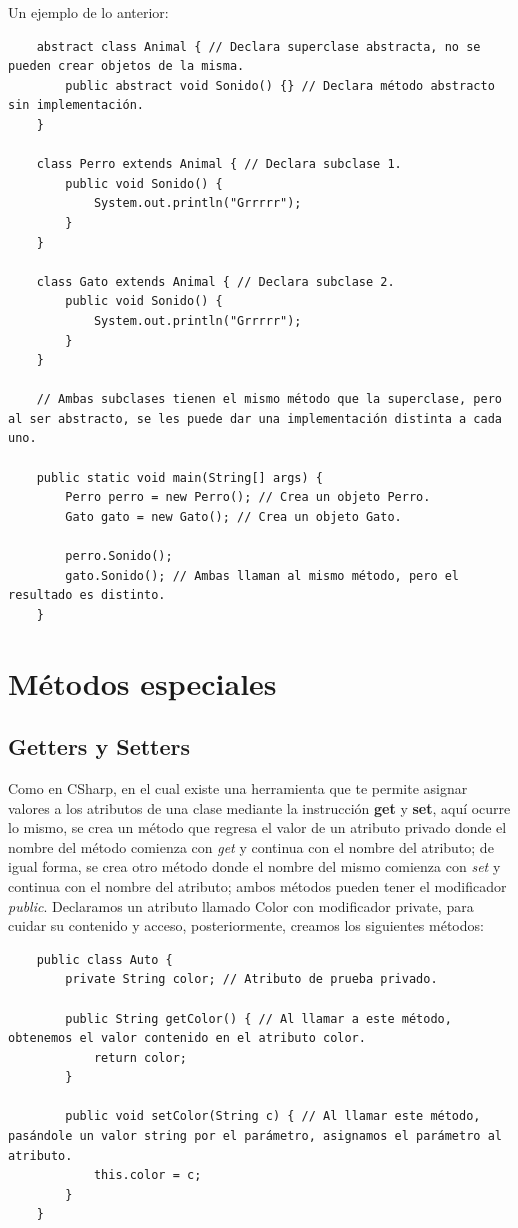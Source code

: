 Un ejemplo de lo anterior:
\begin{lstlisting}
    abstract class Animal { // Declara superclase abstracta, no se pueden crear objetos de la misma.
        public abstract void Sonido() {} // Declara método abstracto sin implementación.
    }
    
    class Perro extends Animal { // Declara subclase 1.
        public void Sonido() {
            System.out.println("Grrrrr");
        }
    }
    
    class Gato extends Animal { // Declara subclase 2.
        public void Sonido() {
            System.out.println("Grrrrr");
        }
    }
    
    // Ambas subclases tienen el mismo método que la superclase, pero al ser abstracto, se les puede dar una implementación distinta a cada uno.
    
    public static void main(String[] args) {
        Perro perro = new Perro(); // Crea un objeto Perro.
        Gato gato = new Gato(); // Crea un objeto Gato.
        
        perro.Sonido();
        gato.Sonido(); // Ambas llaman al mismo método, pero el resultado es distinto.
    }
\end{lstlisting}



\section{Métodos especiales}


\subsection{Getters y Setters}
\hspace{0.55cm}Como en CSharp, en el cual existe una herramienta que te permite asignar valores a los atributos de una clase mediante la instrucción \textbf{get} y \textbf{set}, aquí ocurre lo mismo, se crea un método que regresa el valor de un atributo privado donde el nombre del método comienza con \textit{get} y continua con el nombre del atributo; de igual forma, se crea otro método donde el nombre del mismo comienza con \textit{set} y continua con el nombre del atributo; ambos métodos pueden tener el modificador \textit{public}. Declaramos un atributo llamado Color con modificador private, para cuidar su contenido y acceso, posteriormente, creamos los siguientes métodos:
\begin{lstlisting}
    public class Auto {
        private String color; // Atributo de prueba privado.
        
        public String getColor() { // Al llamar a este método, obtenemos el valor contenido en el atributo color.
            return color;
        }
        
        public void setColor(String c) { // Al llamar este método, pasándole un valor string por el parámetro, asignamos el parámetro al atributo.
            this.color = c;
        }
    }
\end{lstlisting}

